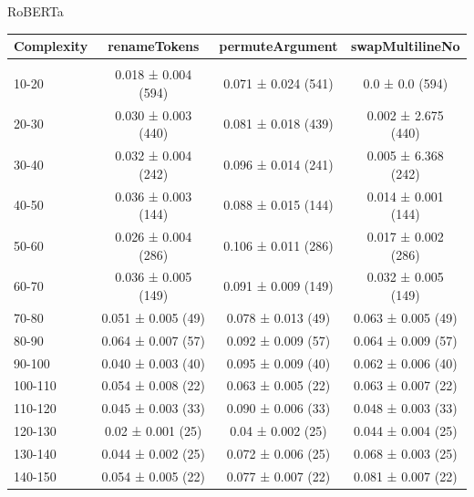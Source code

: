 \documentclass[sigconf,review,anonymous]{acmart}
\begin{document}
{  RoBERTa
    \begin{table}[H]
      \tiny
      \begin{tabular}{l|ccc}
        Complexity          & renameTokens        & permuteArgument     & swapMultilineNo     \\\hline\\
        10-20               & 0.018 ± 0.004 (594) & 0.071 ± 0.024 (541) & 0.0 ± 0.0 (594)     \\
        20-30               & 0.030 ± 0.003 (440) & 0.081 ± 0.018 (439) & 0.002 ± 2.675 (440) \\
        30-40               & 0.032 ± 0.004 (242) & 0.096 ± 0.014 (241) & 0.005 ± 6.368 (242) \\
        40-50               & 0.036 ± 0.003 (144) & 0.088 ± 0.015 (144) & 0.014 ± 0.001 (144) \\
        50-60               & 0.026 ± 0.004 (286) & 0.106 ± 0.011 (286) & 0.017 ± 0.002 (286) \\
        60-70               & 0.036 ± 0.005 (149) & 0.091 ± 0.009 (149) & 0.032 ± 0.005 (149) \\
        70-80               & 0.051 ± 0.005 (49)  & 0.078 ± 0.013 (49)  & 0.063 ± 0.005 (49)  \\
        80-90               & 0.064 ± 0.007 (57)  & 0.092 ± 0.009 (57)  & 0.064 ± 0.009 (57)  \\
        90-100              & 0.040 ± 0.003 (40)  & 0.095 ± 0.009 (40)  & 0.062 ± 0.006 (40)  \\
        100-110             & 0.054 ± 0.008 (22)  & 0.063 ± 0.005 (22)  & 0.063 ± 0.007 (22)  \\
        110-120             & 0.045 ± 0.003 (33)  & 0.090 ± 0.006 (33)  & 0.048 ± 0.003 (33)  \\
        120-130             & 0.02 ± 0.001 (25)   & 0.04 ± 0.002 (25)   & 0.044 ± 0.004 (25)  \\
        130-140             & 0.044 ± 0.002 (25)  & 0.072 ± 0.006 (25)  & 0.068 ± 0.003 (25)  \\
        140-150             & 0.054 ± 0.005 (22)  & 0.077 ± 0.007 (22)  & 0.081 ± 0.007 (22)
      \end{tabular}
    \end{table}
  }

\end{document}
